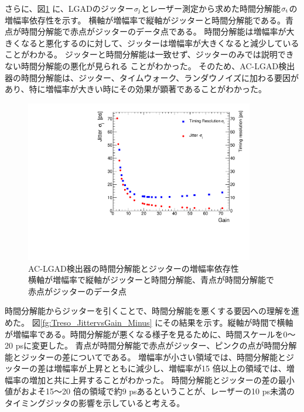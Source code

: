 さらに、図\ref{fg:Jitter_TresovsBias} に、LGADのジッター$\sigma_{\rm{j}}$とレーザー測定から求めた時間分解能$\sigma_{\rm{t}}$の増幅率依存性を示す。
横軸が増幅率で縦軸がジッターと時間分解能である。青点が時間分解能で赤点がジッターのデータ点である。
時間分解能は増幅率が大きくなると悪化するのに対して、ジッターは増幅率が大きくなると減少していることがわかる。
ジッターと時間分解能は一致せず、ジッターのみでは説明できない時間分解能の悪化が見られる
ことがわかった。
そのため、AC-LGAD検出器の時間分解能は、ジッター、タイムウォーク、ランダウノイズに加わる要因があり、特に増幅率が大きい時にその効果が顕著であることがわかった。

\begin{figure}[h]
    \centering
    \includegraphics[width=10cm]{fig/graph/Treso&JittervsGain.pdf}
    \caption[AC-LGAD検出器の時間分解能とジッターの増幅率依存性]{AC-LGAD検出器の時間分解能とジッターの増幅率依存性\\横軸が増幅率で縦軸がジッターと時間分解能、青点が時間分解能で赤点がジッターのデータ点}
    \label{fg:Jitter_TresovsBias}
\end{figure}

時間分解能からジッターを引くことで、時間分解能を悪くする要因への理解を進めた。
図\ref{fg:Treso_JittervsGain_Minus} にその結果を示す。縦軸が時間で横軸が増幅率である。時間分解能が悪くなる様子を見るために、時間スケールを0〜20 psに変更した。
青点が時間分解能で赤点がジッター、ピンクの点が時間分解能とジッターの差についてである。
増幅率が小さい領域では、時間分解能とジッターの差は増幅率が上昇とともに減少し、増幅率が15 倍以上の領域では、増幅率の増加と共に上昇することがわかった。
時間分解能とジッターの差の最小値がおよそ15〜20 倍の領域で約9 psあるということが、レーザーの10 ps未満のタイミングジッタの影響を示していると考える。

